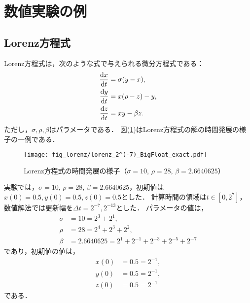 \section{数値実験の例}
\subsection{Lorenz方程式}
Lorenz方程式は，次のような式で与えられる微分方程式である：
\begin{align}
    \frac{\mathrm{d}x}{\mathrm{d}t} &= \sigma(y-x), \\
    \frac{\mathrm{d}y}{\mathrm{d}t} &= x(\rho-z)-y, \\
    \frac{\mathrm{d}z}{\mathrm{d}t} &= xy - \beta z.
\end{align}
ただし，$\sigma,\rho,\beta$はパラメータである．
図(\ref{fig:lorenz})はLorenz方程式の解の時間発展の様子の一例である．
\begin{figure}[H]
    \centering
    \texttt{[image: fig\_lorenz/lorenz\_2^(-7)\_BigFloat\_exact.pdf]}
    \caption{Lorenz方程式の時間発展の様子（$\sigma=10$, $\rho=28$, $\beta=2.6640625$）}
    \label{fig:lorenz}
\end{figure}
実験では，$\sigma=10$, $\rho=28$, $\beta=2.6640625$，初期値は$x(0) = 0.5, y(0) = 0.5, z(0) = 0.5$とした．
計算時間の領域は$t \in [0,2^7]$，数値解法では更新幅を$\Delta t =  2^{-7}, 2^{-13}$とした．
パラメータの値は，
\begin{align}
    \sigma &= 10 = 2^3 + 2^1, \\
    \rho &= 28 = 2^4 + 2^3 + 2^2, \\
    \beta &= 2.6640625 = 2^1 + 2^{-1} + 2^{-3} + 2^{-5} + 2^{-7}
\end{align}
であり，初期値の値は，
\begin{align}
    x(0) &= 0.5 = 2^{-1}, \\
    y(0) &= 0.5 = 2^{-1}, \\
    z(0) &= 0.5 = 2^{-1}
\end{align}
である．
